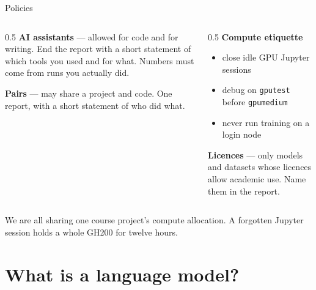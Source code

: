 \documentclass[aspectratio=169,10pt]{beamer}
\begin{document}
\begin{frame}{Policies}
  \begin{columns}[T]
    \begin{column}{0.5\textwidth}
      \textbf{AI assistants} --- allowed for code and for writing.
      End the report with a short statement of which tools you used and for what.
      \alert{Numbers must come from runs you actually did.}
      \vspace{0.6em}

      \textbf{Pairs} --- may share a project and code. One report, with a short
      statement of who did what.
    \end{column}
    \begin{column}{0.5\textwidth}
      \textbf{Compute etiquette}
      \begin{itemize}
        \item close idle GPU Jupyter sessions
        \item debug on \texttt{gputest} before \texttt{gpumedium}
        \item never run training on a login node
      \end{itemize}
      \vspace{0.4em}
      \textbf{Licences} --- only models and datasets whose licences allow
      academic use. Name them in the report.
    \end{column}
  \end{columns}
  \vfill
  \begin{gotcha}
    We are all sharing one course project's compute allocation. A forgotten
    Jupyter session holds a whole GH200 for twelve hours.
  \end{gotcha}
\end{frame}

\section{What is a language model?}
\end{document}
